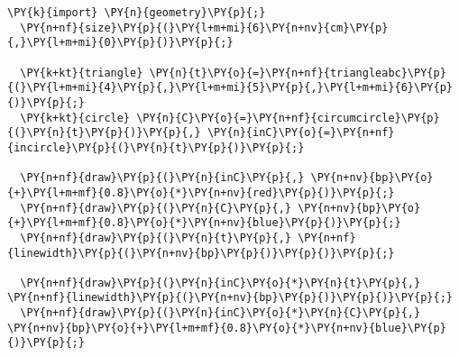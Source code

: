 \begin{Verbatim}[commandchars=\\\{\}]
  \PY{k}{import} \PY{n}{geometry}\PY{p}{;}
  \PY{n+nf}{size}\PY{p}{(}\PY{l+m+mi}{6}\PY{n+nv}{cm}\PY{p}{,}\PY{l+m+mi}{0}\PY{p}{)}\PY{p}{;}

  \PY{k+kt}{triangle} \PY{n}{t}\PY{o}{=}\PY{n+nf}{triangleabc}\PY{p}{(}\PY{l+m+mi}{4}\PY{p}{,}\PY{l+m+mi}{5}\PY{p}{,}\PY{l+m+mi}{6}\PY{p}{)}\PY{p}{;}
  \PY{k+kt}{circle} \PY{n}{C}\PY{o}{=}\PY{n+nf}{circumcircle}\PY{p}{(}\PY{n}{t}\PY{p}{)}\PY{p}{,} \PY{n}{inC}\PY{o}{=}\PY{n+nf}{incircle}\PY{p}{(}\PY{n}{t}\PY{p}{)}\PY{p}{;}

  \PY{n+nf}{draw}\PY{p}{(}\PY{n}{inC}\PY{p}{,} \PY{n+nv}{bp}\PY{o}{+}\PY{l+m+mf}{0.8}\PY{o}{*}\PY{n+nv}{red}\PY{p}{)}\PY{p}{;}
  \PY{n+nf}{draw}\PY{p}{(}\PY{n}{C}\PY{p}{,} \PY{n+nv}{bp}\PY{o}{+}\PY{l+m+mf}{0.8}\PY{o}{*}\PY{n+nv}{blue}\PY{p}{)}\PY{p}{;}
  \PY{n+nf}{draw}\PY{p}{(}\PY{n}{t}\PY{p}{,} \PY{n+nf}{linewidth}\PY{p}{(}\PY{n+nv}{bp}\PY{p}{)}\PY{p}{)}\PY{p}{;}

  \PY{n+nf}{draw}\PY{p}{(}\PY{n}{inC}\PY{o}{*}\PY{n}{t}\PY{p}{,} \PY{n+nf}{linewidth}\PY{p}{(}\PY{n+nv}{bp}\PY{p}{)}\PY{p}{)}\PY{p}{;}
  \PY{n+nf}{draw}\PY{p}{(}\PY{n}{inC}\PY{o}{*}\PY{n}{C}\PY{p}{,} \PY{n+nv}{bp}\PY{o}{+}\PY{l+m+mf}{0.8}\PY{o}{*}\PY{n+nv}{blue}\PY{p}{)}\PY{p}{;}
\end{Verbatim}
